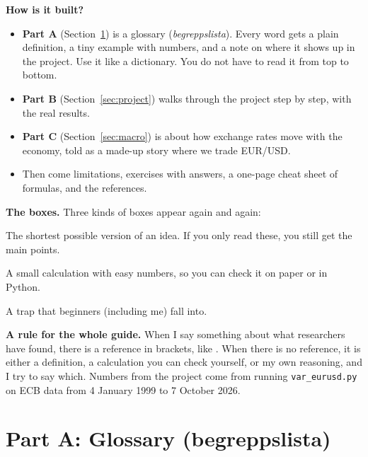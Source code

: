 \documentclass[11pt,a4paper]{article}
\newcommand{\code}[1]{\texttt{#1}}
\begin{document}
\textbf{How is it built?}
\begin{itemize}
  \item \textbf{Part A} (Section~\ref{sec:glossary}) is a glossary
    (\emph{begreppslista}). Every word gets a plain definition, a tiny example
    with numbers, and a note on where it shows up in the project. Use it like
    a dictionary. You do not have to read it from top to bottom.
  \item \textbf{Part B} (Section~\ref{sec:project}) walks through the project
    step by step, with the real results.
  \item \textbf{Part C} (Section~\ref{sec:macro}) is about how exchange rates
    move with the economy, told as a made-up story where we trade EUR/USD.
  \item Then come limitations, exercises with answers, a one-page cheat
    sheet of formulas, and the references.
\end{itemize}

\textbf{The boxes.} Three kinds of boxes appear again and again:

\begin{onesentence}
The shortest possible version of an idea. If you only read these, you still
get the main points.
\end{onesentence}

\begin{example}
A small calculation with easy numbers, so you can check it on paper or in
Python.
\end{example}

\begin{mistake}
A trap that beginners (including me) fall into.
\end{mistake}

\textbf{A rule for the whole guide.} When I say something about what
researchers have found, there is a reference in brackets, like
\citep{jorion2007}. When there is no reference, it is either a definition,
a calculation you can check yourself, or my own reasoning, and I try to say
which. Numbers from the project come from running \code{var\_eurusd.py} on
ECB data from 4 January 1999 to 7 October 2026.

\section{Part A: Glossary (begreppslista)}\label{sec:glossary}
\end{document}
